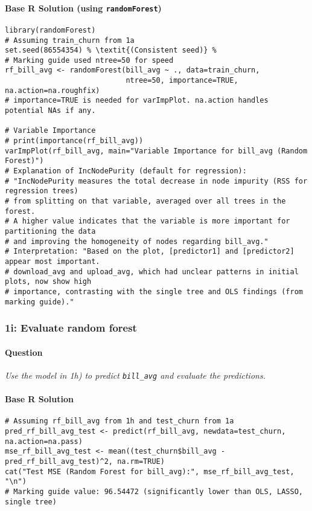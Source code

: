 \documentclass[12pt,a4paper]{article}
\newcommand{\Rpackage}[1]{\texttt{#1}} %
\newcommand{\Rcode}[1]{\texttt{#1}} %
\begin{document}
        \paragraph{Base R Solution (using \Rpackage{randomForest})}
\begin{lstlisting}
library(randomForest)
# Assuming train_churn from 1a
set.seed(86554354) % \textit{(Consistent seed)} %
# Marking guide used ntree=50 for speed
rf_bill_avg <- randomForest(bill_avg ~ ., data=train_churn, 
                            ntree=50, importance=TRUE, na.action=na.roughfix)
# importance=TRUE is needed for varImpPlot. na.action handles potential NAs if any.

# Variable Importance
# print(importance(rf_bill_avg))
varImpPlot(rf_bill_avg, main="Variable Importance for bill_avg (Random Forest)")
# Explanation of IncNodePurity (default for regression):
# "IncNodePurity measures the total decrease in node impurity (RSS for regression trees)
# from splitting on that variable, averaged over all trees in the forest.
# A higher value indicates that the variable is more important for partitioning the data
# and improving the homogeneity of nodes regarding bill_avg."
# Interpretation: "Based on the plot, [predictor1] and [predictor2] appear most important.
# download_avg and upload_avg, which had unclear patterns in initial plots, now show high
# importance, contrasting with the single tree and OLS findings (from marking guide)."
\end{lstlisting}

    \subsubsection{1i: Evaluate random forest}
        \paragraph{Question}
        \textit{Use the model in 1h) to predict \Rcode{bill\_avg} and evaluate the predictions.}
        \paragraph{Base R Solution}
\begin{lstlisting}
# Assuming rf_bill_avg from 1h and test_churn from 1a
pred_rf_bill_avg_test <- predict(rf_bill_avg, newdata=test_churn, na.action=na.pass)
mse_rf_bill_avg_test <- mean((test_churn$bill_avg - pred_rf_bill_avg_test)^2, na.rm=TRUE)
cat("Test MSE (Random Forest for bill_avg):", mse_rf_bill_avg_test, "\n")
# Marking guide value: 96.54472 (significantly lower than OLS, LASSO, single tree)
\end{lstlisting}
\end{document}
